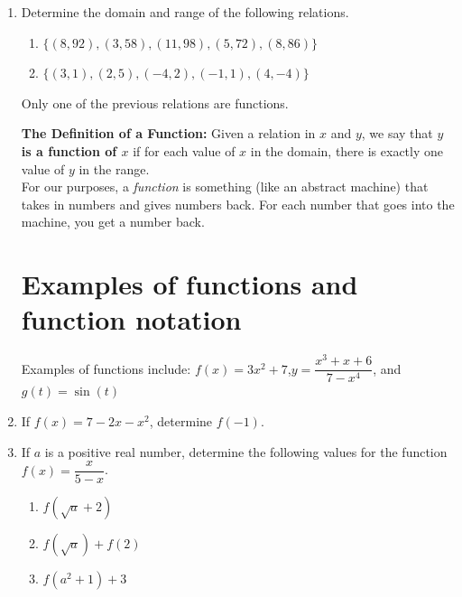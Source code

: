 \documentclass[11pt]{article}
\begin{document}
\begin{enumerate}
\item Determine the domain and range of the following relations.
\begin{enumerate}
\item $\{(8,92), (3,58), (11,98), (5,72), (8,86) \}$\\[1in]
\item $\{(3,1), (2,5), (-4,2), (-1,1), (4,-4) \}$\\[1in]
\end{enumerate}
\vfill
Only one of the previous relations are functions.\\

\newpage

\noindent \textbf{The Definition of a Function:}  Given a relation in $x$ and $y$, we say that \textbf{$y$ is a function of $x$} if for each value of $x$ in the domain, there is exactly one value of $y$ in the range.\\

For our purposes, a \emph{function} is something (like an abstract machine) that takes in numbers and gives numbers back.  For each number that goes into the machine, you get a number back.



 \section{Examples of functions and function notation}
Examples of functions include: $f(x) = 3x^2 +7$,\quad  $y = \dfrac{x^3+x+6}{7-x^4}$, and $g(t) = \sin(t)$\\[.5in]




\item If $f(x)= 7 - 2x - x^2$, determine $f(-1)$. \\[.5in]

\item If $a$ is a positive real number, determine the following values for the function $f(x) = \dfrac{x}{5-x}$.

\begin{enumerate}

\item $f(\sqrt{a}+2)$ \\[.5in]

\item $f(\sqrt{a})+f(2)$ \\[.5in]


\item $f(a^2+1)+3$ \\[.5in]
\end{enumerate}





\end{enumerate}
\end{document}
